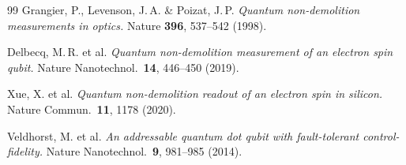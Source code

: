 \begin{thebibliography}{99}
Grangier, P., Levenson, J.\,A. \& Poizat, J.\,P.
\textit{Quantum non-demolition measurements in optics.}
Nature \textbf{396}, 537--542 (1998).

Delbecq, M.\,R. et al.
\textit{Quantum non-demolition measurement of an electron spin qubit.}
Nature Nanotechnol.\ \textbf{14}, 446--450 (2019).

Xue, X. et al.
\textit{Quantum non-demolition readout of an electron spin in silicon.}
Nature Commun.\ \textbf{11}, 1178 (2020).

Veldhorst, M. et al.
\textit{An addressable quantum dot qubit with fault-tolerant control-fidelity.}
Nature Nanotechnol.\ \textbf{9}, 981--985 (2014).

\end{thebibliography}
